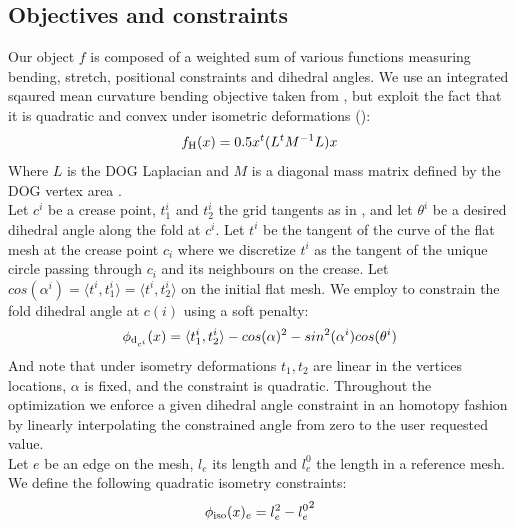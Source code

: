 \subsection{Objectives and constraints} \label{sec:dog_obj}
Our object $f$ is composed of a weighted sum of various functions measuring bending, stretch, positional constraints and dihedral angles.
We use an integrated sqaured mean curvature bending objective taken from \cite{rabi2018shape}, but exploit the fact that it is quadratic and convex under isometric deformations (\cite{quadratic_bending}):
\begin{equation}
f_\text{H}(x) = 0.5x^t(L^tM^{-1}L)x
\end{equation}
Where $L$ is the DOG Laplacian and $M$ is a diagonal mass matrix defined by the DOG vertex area \cite{rabi2018shape}. \\
Let $c^i$ be a crease point, $t_1^i$ and $t_2^i$ the grid tangents as in , and let $\theta^i$ be a desired dihedral angle along the fold at $c^i$. Let $t^i$ be the tangent of the curve of the flat mesh at the crease point $c_i$ where we discretize $t^i$ as the tangent of the unique circle passing through $c_i$ and its neighbours on the crease. Let $cos(\alpha^i) = \langle t^i,t_1^i \rangle = \langle t^i,t_2^i \rangle$ on the initial flat mesh. We employ  to constrain the fold dihedral angle at $c(i)$ using a soft penalty:
\begin{equation}
\phi_{\text{d}_{c^i}}(x) = \langle t_1^i, t_2^i \rangle - cos(\alpha)^2 - sin^2(\alpha^i) cos(\theta^i)
\end{equation}
And note that under isometry deformations $t_1,t_2$ are linear in the vertices locations, $\alpha$ is fixed, and the constraint is quadratic. Throughout the optimization we enforce a given dihedral angle constraint in an homotopy fashion by linearly interpolating the constrained angle from zero to the user requested value. \\
Let $e$ be an edge on the mesh, $l_e$ its length and $l_e^0$ the length in a reference mesh. We define the following quadratic isometry constraints:
\begin{equation}
\phi_\text{iso}(x)_e = l_e^2 - {l_e^0}^2
\end{equation}
